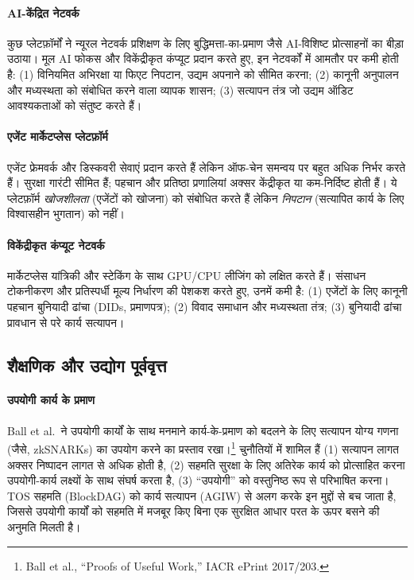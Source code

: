 \documentclass[11pt]{article}
\begin{document}
\paragraph{AI-केंद्रित नेटवर्क} कुछ प्लेटफ़ॉर्मों ने न्यूरल नेटवर्क प्रशिक्षण के लिए बुद्धिमत्ता-का-प्रमाण जैसे AI-विशिष्ट प्रोत्साहनों का बीड़ा उठाया। मूल AI फोकस और विकेंद्रीकृत कंप्यूट प्रदान करते हुए, इन नेटवर्कों में आमतौर पर कमी होती है: (1) विनियमित अभिरक्षा या फिएट निपटान, उद्यम अपनाने को सीमित करना; (2) कानूनी अनुपालन और मध्यस्थता को संबोधित करने वाला व्यापक शासन; (3) सत्यापन तंत्र जो उद्यम ऑडिट आवश्यकताओं को संतुष्ट करते हैं।

\paragraph{एजेंट मार्केटप्लेस प्लेटफ़ॉर्म} एजेंट फ्रेमवर्क और डिस्कवरी सेवाएं प्रदान करते हैं लेकिन ऑफ-चेन समन्वय पर बहुत अधिक निर्भर करते हैं। सुरक्षा गारंटी सीमित हैं; पहचान और प्रतिष्ठा प्रणालियां अक्सर केंद्रीकृत या कम-निर्दिष्ट होती हैं। ये प्लेटफ़ॉर्म \emph{खोजशीलता} (एजेंटों को खोजना) को संबोधित करते हैं लेकिन \emph{निपटान} (सत्यापित कार्य के लिए विश्वासहीन भुगतान) को नहीं।

\paragraph{विकेंद्रीकृत कंप्यूट नेटवर्क} मार्केटप्लेस यांत्रिकी और स्टेकिंग के साथ GPU/CPU लीजिंग को लक्षित करते हैं। संसाधन टोकनीकरण और प्रतिस्पर्धी मूल्य निर्धारण की पेशकश करते हुए, उनमें कमी है: (1) एजेंटों के लिए कानूनी पहचान बुनियादी ढांचा (DIDs, प्रमाणपत्र); (2) विवाद समाधान और मध्यस्थता तंत्र; (3) बुनियादी ढांचा प्रावधान से परे कार्य सत्यापन।

\subsection{शैक्षणिक और उद्योग पूर्ववृत्त}
\paragraph{उपयोगी कार्य के प्रमाण} Ball et al.\ ने उपयोगी कार्यों के साथ मनमाने कार्य-के-प्रमाण को बदलने के लिए सत्यापन योग्य गणना (जैसे, zkSNARKs) का उपयोग करने का प्रस्ताव रखा।\footnote{Ball et al., ``Proofs of Useful Work,'' IACR ePrint 2017/203.} चुनौतियों में शामिल हैं (1) सत्यापन लागत अक्सर निष्पादन लागत से अधिक होती है, (2) सहमति सुरक्षा के लिए अतिरेक कार्य को प्रोत्साहित करना उपयोगी-कार्य लक्ष्यों के साथ संघर्ष करता है, (3) ``उपयोगी'' को वस्तुनिष्ठ रूप से परिभाषित करना। TOS सहमति (BlockDAG) को कार्य सत्यापन (AGIW) से अलग करके इन मुद्दों से बच जाता है, जिससे उपयोगी कार्यों को सहमति में मजबूर किए बिना एक सुरक्षित आधार परत के ऊपर बसने की अनुमति मिलती है।
\end{document}
